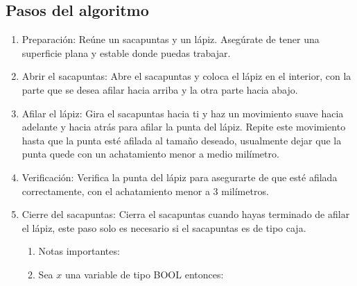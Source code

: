 \documentclass{article}
\begin{document}
\subsection*{Pasos del algoritmo}
\begin{enumerate}
    \item   Preparación: Reúne un sacapuntas y un lápiz. Asegúrate de tener una superficie plana y estable donde puedas trabajar.
    \item   Abrir el sacapuntas: Abre el sacapuntas y coloca el lápiz en el interior, con la parte que se desea afilar hacia arriba y la otra parte hacia abajo.
    \item   Afilar el lápiz: Gira el sacapuntas hacia ti y haz un movimiento suave hacia adelante y hacia atrás para afilar la punta del lápiz. Repite este movimiento hasta que la punta esté afilada al tamaño deseado, usualmente dejar que la punta quede con un achatamiento menor a medio milímetro.
    \item   Verificación: Verifica la punta del lápiz para asegurarte de que esté afilada correctamente, con el achatamiento menor a 3 milímetros.
    \item   Cierre del sacapuntas: Cierra el sacapuntas cuando hayas terminado de afilar el lápiz, este paso solo es necesario si el sacapuntas es de tipo caja.

\begin{enumerate}
    \item Notas importantes:
    \item Sea $x$ una variable de tipo \textsc{BOOL} entonces:
\end{enumerate}


\end{enumerate}
\end{document}
